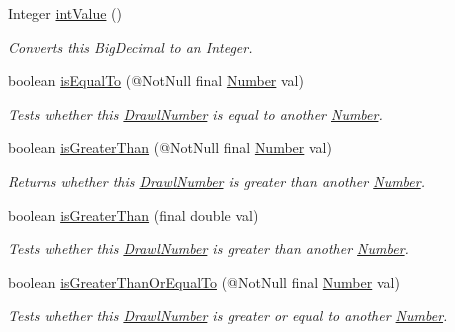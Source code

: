 \begin{DoxyCompactItemize}
Integer \hyperlink{classcom_1_1aarrelaakso_1_1drawl_1_1_drawl_number_a8022d04415c5449344ac1e23658f8802}{int\+Value} ()
\begin{DoxyCompactList}\small\item\em Converts this Big\+Decimal to an Integer. \end{DoxyCompactList}\item 
boolean \hyperlink{classcom_1_1aarrelaakso_1_1drawl_1_1_drawl_number_af9c62a136858a5eae279039658a2cfdc}{is\+Equal\+To} (@Not\+Null final \hyperlink{interfacecom_1_1aarrelaakso_1_1drawl_1_1_number}{Number} val)
\begin{DoxyCompactList}\small\item\em Tests whether this \hyperlink{classcom_1_1aarrelaakso_1_1drawl_1_1_drawl_number}{Drawl\+Number} is equal to another \hyperlink{interfacecom_1_1aarrelaakso_1_1drawl_1_1_number}{Number}. \end{DoxyCompactList}\item 
boolean \hyperlink{classcom_1_1aarrelaakso_1_1drawl_1_1_drawl_number_a17616696cef2e7b72d2614481182293a}{is\+Greater\+Than} (@Not\+Null final \hyperlink{interfacecom_1_1aarrelaakso_1_1drawl_1_1_number}{Number} val)
\begin{DoxyCompactList}\small\item\em Returns whether this \hyperlink{classcom_1_1aarrelaakso_1_1drawl_1_1_drawl_number}{Drawl\+Number} is greater than another \hyperlink{interfacecom_1_1aarrelaakso_1_1drawl_1_1_number}{Number}. \end{DoxyCompactList}\item 
boolean \hyperlink{classcom_1_1aarrelaakso_1_1drawl_1_1_drawl_number_ae60f5bdfeec3c50dec35e5310f163fa4}{is\+Greater\+Than} (final double val)
\begin{DoxyCompactList}\small\item\em Tests whether this \hyperlink{classcom_1_1aarrelaakso_1_1drawl_1_1_drawl_number}{Drawl\+Number} is greater than another \hyperlink{interfacecom_1_1aarrelaakso_1_1drawl_1_1_number}{Number}. \end{DoxyCompactList}\item 
boolean \hyperlink{classcom_1_1aarrelaakso_1_1drawl_1_1_drawl_number_a4818a61a5d26f43b0d5e11cb9f22551f}{is\+Greater\+Than\+Or\+Equal\+To} (@Not\+Null final \hyperlink{interfacecom_1_1aarrelaakso_1_1drawl_1_1_number}{Number} val)
\begin{DoxyCompactList}\small\item\em Tests whether this \hyperlink{classcom_1_1aarrelaakso_1_1drawl_1_1_drawl_number}{Drawl\+Number} is greater or equal to another \hyperlink{interfacecom_1_1aarrelaakso_1_1drawl_1_1_number}{Number}. \end{DoxyCompactList}\item 

\end{DoxyCompactItemize}
